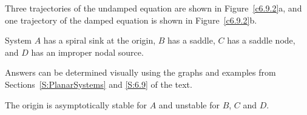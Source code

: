 Three trajectories of the undamped equation are shown in Figure~\ref{c6.9.2}a,
and one trajectory of the damped equation is shown in Figure~\ref{c6.9.2}b.




\begin{figure}[htb]
                       \centerline{%
                       }
\end{figure}

 \ans System $A$ has a spiral sink at the origin, $B$ has a
saddle, $C$ has a saddle node, and $D$ has an improper nodal source.

\soln Answers can be determined visually using the graphs and examples
from Sections~\ref{S:PlanarSystems} and \ref{S:6.9} of the text.

 \ans The origin is asymptotically stable for $A$ and unstable
for $B$, $C$ and $D$.

